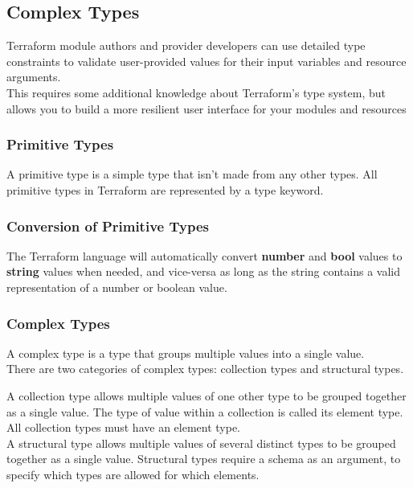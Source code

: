 \documentclass[12pt, letterpaper, twoside]{article}
\begin{document}
\subsection{Complex Types}
Terraform module authors and provider developers can use detailed type constraints to validate user-provided 
values for their input variables and resource arguments.\\ 
This requires some additional knowledge about Terraform's type system, but allows you to build a more resilient
user interface for your modules and resources

\subsubsection{Primitive Types}
A primitive type is a simple type that isn't made from any other types. All primitive types in Terraform are 
represented by a type keyword.

\subsubsection{Conversion of Primitive Types}
The Terraform language will automatically convert \textbf{number} and \textbf{bool} values to \textbf{string} 
values when needed, and vice-versa as long as the string contains a valid representation of a number or 
boolean value.

\subsubsection{Complex Types}
A complex type is a type that groups multiple values into a single value.\\ 
There are two categories of complex types: collection types and structural types.

A collection type allows multiple values of one other type to be grouped together as a single value. 
The type of value within a collection is called its element type. All collection types must have an element 
type.\\

A structural type allows multiple values of several distinct types to be grouped together as a single value.
Structural types require a schema as an argument, to specify which types are allowed for which elements.
\end{document}
